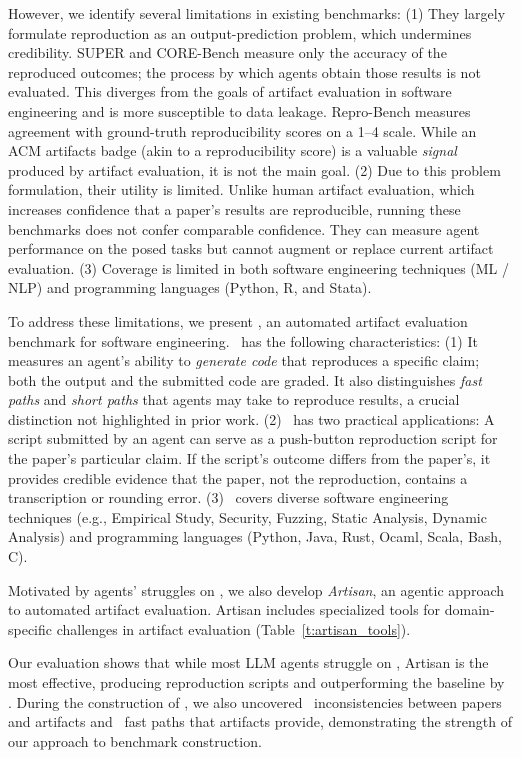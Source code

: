 However, we identify several limitations in existing benchmarks:
(1) They largely formulate reproduction as an output-prediction problem, which undermines credibility.
SUPER and CORE-Bench measure only the accuracy of the reproduced outcomes; the process by which agents obtain those results is not evaluated.
This diverges from the goals of artifact evaluation in software engineering and is more susceptible to data leakage.
Repro-Bench measures agreement with ground-truth reproducibility scores on a 1–4 scale.
While an ACM artifacts badge (akin to a reproducibility score) is a valuable \emph{signal} produced by artifact evaluation, it is not the main goal.
(2) Due to this problem formulation, their utility is limited.
Unlike human artifact evaluation, which increases confidence that a paper’s results are reproducible, running these benchmarks does not confer comparable confidence.
They can measure agent performance on the posed tasks but cannot augment or replace current artifact evaluation.
(3) Coverage is limited in both software engineering techniques (ML / NLP) and programming languages (Python, R, and Stata).

To address these limitations, we present \benchmark, an automated artifact evaluation benchmark for software engineering.
\benchmark~has the following characteristics:
(1) It measures an agent’s ability to \emph{generate code} that reproduces a specific claim; both the output and the submitted code are graded.
It also distinguishes \emph{fast paths} and \emph{short paths} that agents may take to reproduce results, a crucial distinction not highlighted in prior work.
(2) \benchmark~has two practical applications:
A script submitted by an agent can serve as a push-button reproduction script for the paper’s particular claim.
If the script’s outcome differs from the paper’s, it provides credible evidence that the paper, not the reproduction, contains a transcription or rounding error.
(3) \benchmark~covers diverse software engineering techniques (e.g., Empirical Study, Security, Fuzzing, Static Analysis, Dynamic Analysis) and programming languages (Python, Java, Rust, Ocaml, Scala, Bash, C).

Motivated by agents’ struggles on \benchmark, we also develop \emph{Artisan}, an agentic approach to automated artifact evaluation.
Artisan includes specialized tools for domain-specific challenges in artifact evaluation (Table~\ref{t:artisan_tools}).

Our evaluation shows that while most LLM agents struggle on \benchmark, Artisan is the most effective, producing \particularscriptsize{} reproduction scripts and outperforming the baseline by \particularscriptsizeoutperform{}.
During the construction of \benchmark, we also uncovered \inconsistenciessize~inconsistencies between papers and artifacts and \fastpathsize~fast paths that artifacts provide, demonstrating the strength of our approach to benchmark construction.

